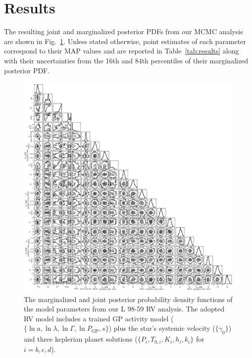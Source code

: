\documentclass[longauth]{aa}
\begin{document}
\section{Results}
\label{sec:results} 
The resulting joint and marginalized posterior PDFs from our MCMC analysis are shown in Fig.~\ref{fig:corner}. Unless stated otherwise, point estimates of each parameter correspond to their MAP values and are reported in Table~\ref{tab:results} along with their uncertainties from the 16th and 84th percentiles of their marginalized posterior PDF.

\begin{figure}
    \centering
    \includegraphics[width=.99\hsize]{corner.png}
    \caption{The marginalized and joint posterior probability density functions of the model parameters from our L 98-59 RV analysis. The adopted RV model includes a trained GP activity model ($\{ \ln{a}, \ln{\lambda}, \ln{\Gamma}, \ln{P_{\text{GP}}}, s \}$) plus the star's systemic velocity ($\{ \gamma_0 \}$) and three keplerian planet solutions ($\{ P_i, T_{0,i}, K_i, h_i, k_i \}$ for $i=b,c,d$).}
    \label{fig:corner}
\end{figure}
\end{document}
